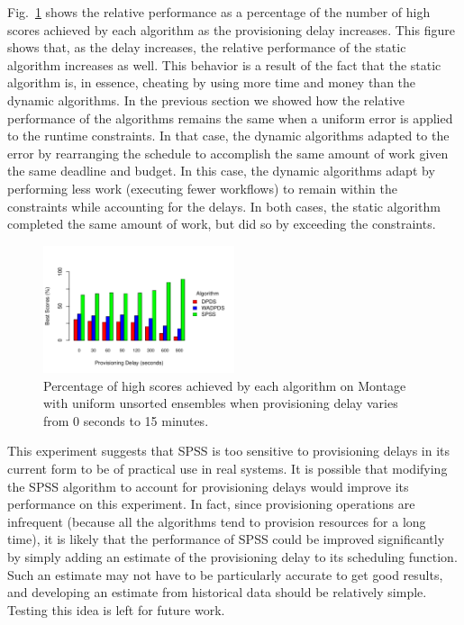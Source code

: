 \documentclass[conference]{IEEEtran}
\begin{document}
Fig.~\ref{fig:delays_scores} shows the relative performance as a
percentage of the number of high scores achieved by each algorithm as the
provisioning delay increases. This figure shows that, as the delay
increases, the relative performance of the static algorithm increases as
well. This behavior is a result of the fact that the static algorithm is, in
essence, cheating by using more time and money than the dynamic algorithms.
In the previous section we showed how the relative performance of the
algorithms remains the same when a uniform error is applied to the runtime
constraints. In that case, the dynamic algorithms adapted to the error by
rearranging the schedule to accomplish the same amount of work given the
same deadline and budget. In this case, the dynamic algorithms adapt by
performing less work (executing fewer workflows) to remain within the
constraints while accounting for the delays. In both cases, the static
algorithm completed the same amount of work, but did so by exceeding the
constraints.

\begin{figure}[ht]
  \centering
  \includegraphics[width=0.5\textwidth]{delays_scores}
  \caption{Percentage of high scores achieved by each algorithm on Montage 
  with uniform unsorted ensembles when provisioning delay varies from 0 
  seconds to 15 minutes.}
  \label{fig:delays_scores}
\end{figure}

This experiment suggests that SPSS is too sensitive to provisioning delays
in its current form to be of practical use in real systems. It is possible
that modifying the SPSS algorithm to account for provisioning delays would
improve its performance on this experiment. In fact, since provisioning
operations are infrequent (because all the algorithms tend to provision
resources for a long time), it is likely that the performance of SPSS could be
improved significantly by simply adding an estimate of the provisioning delay
to its scheduling function. Such an estimate may not have to be particularly
accurate to get good results, and developing an estimate from historical data
should be relatively simple. Testing this idea is left for future work.
\end{document}
